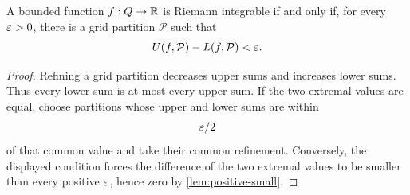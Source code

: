 \begin{proposition}
\label{prop:multivariable-darboux}
A bounded function $f:Q\to\mathbb{R}$ is Riemann integrable if and only if, for every $\varepsilon>0$, there is a grid partition $\mathcal P$ such that
\[
U(f,\mathcal P)-L(f,\mathcal P)<\varepsilon.
\]
\end{proposition}
\begin{proof}
Refining a grid partition decreases upper sums and increases lower sums.
Thus every lower sum is at most every upper sum.  If the two extremal values
are equal, choose partitions whose upper and lower sums are within
\[
\varepsilon/2
\]
of that common value and take their common refinement.  Conversely, the
displayed condition forces the difference of the two extremal values to be
smaller than every positive $\varepsilon$, hence zero by
\cref{lem:positive-small}.
\end{proof}


